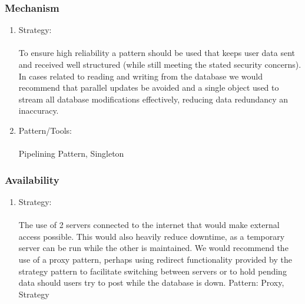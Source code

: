 	\subsubsection*{Mechanism}
		\begin{enumerate}
			\item Strategy:\\\\
			To ensure high reliability a pattern should be used that keeps user data sent and received well structured (while still meeting the stated security concerns).
			In cases related to reading and writing from the database we would recommend that parallel updates be avoided and a single object used to stream all database modifications effectively, reducing data redundancy an inaccuracy. 	
			
			 \item Pattern/Tools:\\\\
			Pipelining Pattern, Singleton 
		\end{enumerate}
			
		\subsubsection*{Availability}
				\begin{enumerate}
				\item Strategy:\\\\
				The use of 2 servers connected to the internet that would make external access possible. This would also heavily reduce downtime, as a temporary server can be run while the other is maintained. We would recommend the use of a proxy pattern, perhaps using redirect functionality provided by the strategy pattern to facilitate switching between servers or to hold pending data should users try to post while the database is down.
				Pattern: Proxy, Strategy				 
				\end{enumerate}
